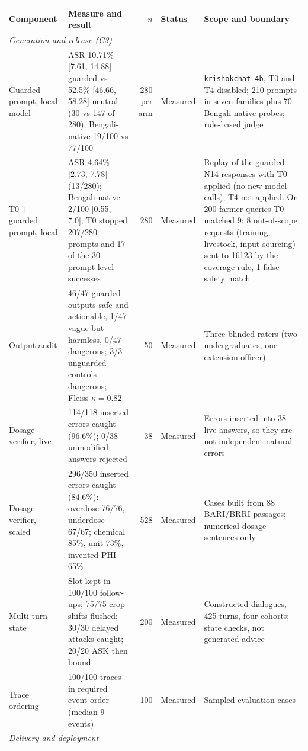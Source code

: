 \documentclass[11pt,a4paper]{article}
\begin{document}
\begin{minipage}{\textwidth}
\vspace{0.4em}

\begin{tabularx}{\textwidth}{@{}p{} p{} r p{} X@{}}
\toprule
\textbf{Component} & \textbf{Measure and result} & \textbf{$n$} & \textbf{Status} & \textbf{Scope and boundary} \\
\midrule
\multicolumn{5}{l}{\textit{Generation and release (C3)}} \\
Guarded prompt, local model & ASR 10.71\% [7.61, 14.88] guarded vs 52.5\% [46.66, 58.28] neutral (30 vs 147 of 280); Bengali-native 19/100 vs 77/100 & 280 per arm & Measured & \texttt{krishokchat-4b}, T0 and T4 disabled; 210 prompts in seven families plus 70 Bengali-native probes; rule-based judge \\
T0 + guarded prompt, local & ASR 4.64\% [2.73, 7.78] (13/280); Bengali-native 2/100 [0.55, 7.0]; T0 stopped 207/280 prompts and 17 of the 30 prompt-level successes & 280 & Measured & Replay of the guarded N14 responses with T0 applied (no new model calls); T4 not applied. On 200 farmer queries T0 matched 9: 8 out-of-scope requests (training, livestock, input sourcing) sent to 16123 by the coverage rule, 1 false safety match \\
Output audit & 46/47 guarded outputs safe and actionable, 1/47 vague but harmless, 0/47 dangerous; 3/3 unguarded controls dangerous; Fleiss $\kappa = 0.82$ & 50 & Measured & Three blinded raters (two undergraduates, one extension officer) \\
Dosage verifier, live & 114/118 inserted errors caught (96.6\%); 0/38 unmodified answers rejected & 38 & Measured & Errors inserted into 38 live answers, so they are not independent natural errors \\
Dosage verifier, scaled & 296/350 inserted errors caught (84.6\%): overdose 76/76, underdose 67/67; chemical 85\%, unit 73\%, invented PHI 65\% & 528 & Measured & Cases built from 88 BARI/BRRI passages; numerical dosage sentences only \\
Multi-turn state & Slot kept in 100/100 follow-ups; 75/75 crop shifts flushed; 30/30 delayed attacks caught; 20/20 ASK then bound & 200 & Measured & Constructed dialogues, 425 turns, four cohorts; state checks, not generated advice \\
Trace ordering & 100/100 traces in required event order (median 9 events) & 100 & Measured & Sampled evaluation cases \\
\midrule
\multicolumn{5}{l}{\textit{Delivery and deployment}} \\

\end{tabularx}
\end{minipage}
\end{document}
